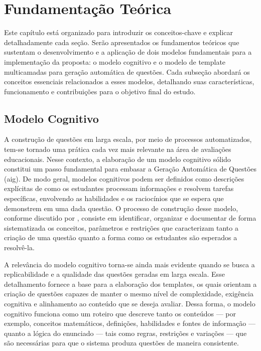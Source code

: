 \chapter{Fundamentação Teórica}\label{cap:fundamentacao-teorica}

Este capítulo está organizado para introduzir os conceitos-chave e explicar detalhadamente cada seção. Serão apresentados os fundamentos teóricos que sustentam o desenvolvimento e a aplicação de dois modelos fundamentais para a implementação da proposta: o modelo cognitivo e o modelo de template multicamadas para geração automática de questões. Cada subseção abordará os conceitos essenciais relacionados a esses modelos, detalhando suas características, funcionamento e contribuições para o objetivo final do estudo.

\section{Modelo Cognitivo}
A construção de questões em larga escala, por meio de processos automatizados, tem-se tornado uma prática cada vez mais relevante na área de avaliações educacionais. Nesse contexto, a elaboração de um modelo cognitivo sólido constitui um passo fundamental para embasar a Geração Automática de Questões (\gls{aig}). De modo geral, modelos cognitivos podem ser definidos como descrições explícitas de como os estudantes processam informações e resolvem tarefas específicas, envolvendo as habilidades e os raciocínios que se espera que demonstrem em uma dada questão. O processo de construção desse modelo, conforme discutido por \parencite{gierl2021}, consiste em identificar, organizar e documentar de forma sistematizada os conceitos, parâmetros e restrições que caracterizam tanto a criação de uma questão quanto a forma como os estudantes são esperados a resolvê-la.

A relevância do modelo cognitivo torna-se ainda mais evidente quando se busca a replicabilidade e a qualidade das questões geradas em larga escala. Esse detalhamento fornece a base para a elaboração dos templates, os quais orientam a criação de questões capazes de manter o mesmo nível de complexidade, exigência cognitiva e alinhamento ao conteúdo que se deseja avaliar. Dessa forma, o modelo cognitivo funciona como um roteiro que descreve tanto os conteúdos — por exemplo, conceitos matemáticos, definições, habilidades e fontes de informação — quanto a lógica do enunciado — tais como regras, restrições e variações — que são necessárias para que o sistema produza questões de maneira consistente.

